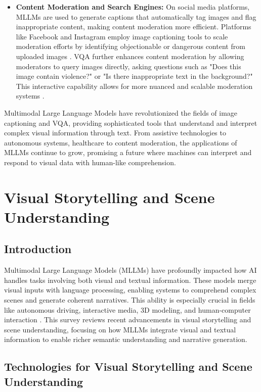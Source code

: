 \begin{itemize}
    \item \textbf{Content Moderation and Search Engines:} On social media platforms, MLLMs are used to generate captions that automatically tag images and flag inappropriate content, making content moderation more efficient. Platforms like Facebook and Instagram employ image captioning tools to scale moderation efforts by identifying objectionable or dangerous content from uploaded images \cite{icmeta2020content}. VQA further enhances content moderation by allowing moderators to query images directly, asking questions such as "Does this image contain violence?" or "Is there inappropriate text in the background?" This interactive capability allows for more nuanced and scalable moderation systems \cite{moderation_vqa2021}.
\end{itemize}


Multimodal Large Language Models have revolutionized the fields of image captioning and VQA, providing sophisticated tools that understand and interpret complex visual information through text. From assistive technologies to autonomous systems, healthcare to content moderation, the applications of MLLMs continue to grow, promising a future where machines can interpret and respond to visual data with human-like comprehension.

\section{Visual Storytelling and Scene Understanding}

\subsection{Introduction}

Multimodal Large Language Models (MLLMs) have profoundly impacted how AI handles tasks involving both visual and textual information. These models merge visual inputs with language processing, enabling systems to comprehend complex scenes and generate coherent narratives. This ability is especially crucial in fields like autonomous driving, interactive media, 3D modeling, and human-computer interaction \cite{vs2024li,vs2020hong}. This survey reviews recent advancements in visual storytelling and scene understanding, focusing on how MLLMs integrate visual and textual information to enable richer semantic understanding and narrative generation.

\subsection{Technologies for Visual Storytelling and Scene Understanding}

